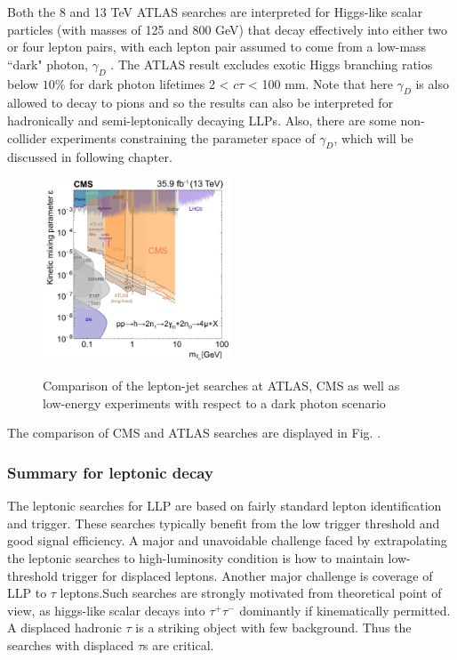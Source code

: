 Both the 8 and 13 TeV ATLAS searches are interpreted for Higgs-like scalar particles (with masses of 125 and 800 GeV) that decay effectively into either two or four lepton pairs, with each lepton pair assumed to come from a low-mass “dark" photon, $\gamma_D$ . The ATLAS result excludes exotic Higgs branching ratios below $10\%$ for dark photon lifetimes 2 < $c\tau$ < 100 mm. Note that here $\gamma_D$ is also allowed to decay to pions and so the results can also be interpreted for hadronically and semi-leptonically decaying LLPs. Also, there are some non-collider experiments constraining the parameter space of $\gamma_D$, which will be discussed in following chapter.
\begin{figure}
    \centering
    \caption{Comparison of the lepton-jet searches at ATLAS, CMS as well as low-energy experiments with respect to a dark photon scenario}
    \includegraphics[width=0.5\textwidth]{fig/leptonjet.png}
    \label{fig:lepton-jet}
\end{figure}

The comparison of CMS and ATLAS searches are displayed in Fig. \cite{fig:lepton-jet}.


\subsubsection{Summary for leptonic decay}

The leptonic searches for LLP are based on fairly standard lepton identification and trigger. These searches typically benefit from the low trigger threshold  and good signal efficiency. A major and unavoidable challenge faced by extrapolating the leptonic searches to high-luminosity condition is how to maintain low-threshold trigger for displaced leptons. Another major challenge is coverage of LLP to $\tau$ leptons.Such searches are strongly motivated from theoretical point of view, as higgs-like scalar decays into $\tau^+\tau^-$ dominantly if kinematically permitted. A displaced hadronic $\tau$ is a striking object with few background. Thus the searches with displaced $\tau$s are critical.

